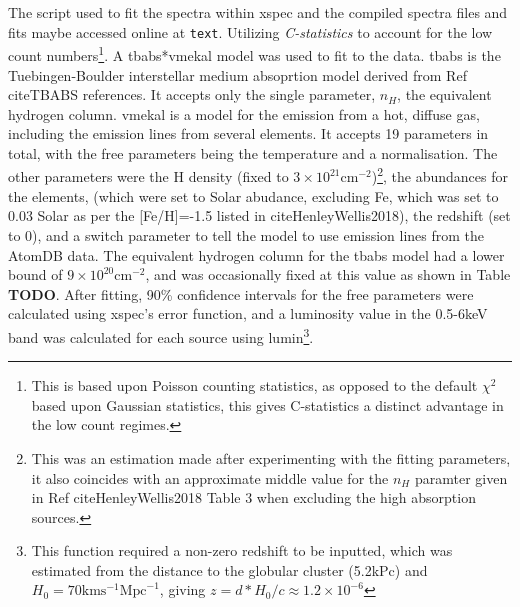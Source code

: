 \documentclass[aps,
                pra,  
                a4paper, 
                amsmath, 
                amssymb, 
                preprint,
                tightenlines,  
                amsfonts,
                nofootinbib,
                notitlepage
            ]{revtex4-2}
\begin{document}
The script used to fit the spectra within {\sc xspec} and the compiled spectra files and fits maybe accessed online at {\verb|text|}. Utilizing {\it C-statistics} to account for the low count numbers\footnote{This is based upon Poisson counting statistics, as opposed to the default $\chi^2$ based upon Gaussian statistics, this gives C-statistics a distinct advantage in the low count regimes.}. A {\sc tbabs*vmekal} model was used to fit to the data. {\sc tbabs} is the Tuebingen-Boulder interstellar medium absoprtion model derived from Ref cite{TBABS references}. It accepts only the single parameter, $n_H$, the equivalent hydrogen column. {\sc vmekal} is a model for the emission from a hot, diffuse gas, including the emission lines from several elements. It accepts 19 parameters in total, with the free parameters being the temperature and a normalisation. The other parameters were the H density (fixed to $3\times10^{21}\text{cm}^{-2}$)\footnote{This was an estimation made after experimenting with the fitting parameters, it also coincides with an approximate middle value for the $n_H$ paramter given in Ref cite{HenleyWellis2018} Table 3 when excluding the high absorption sources.}, the abundances for the elements, (which were set to Solar abudance, excluding Fe, which was set to 0.03 Solar as per the [Fe/H]=-1.5 listed in cite{HenleyWellis2018}), the redshift (set to 0), and a switch parameter to tell the model to use emission lines from the AtomDB data. The equivalent hydrogen column for the {\sc tbabs} model had a lower bound of $9\times10^{20}\text{cm}^{-2}$, and was occasionally fixed at this value as shown in Table {\bf TODO}. After fitting, 90\% confidence intervals for the free parameters were calculated using {\sc xspec}'s {\sc error} function, and a luminosity value in the 0.5-6keV band was calculated for each source using {\sc lumin}\footnote{This function required a non-zero redshift to be inputted, which was estimated from the distance to the globular cluster (5.2kPc) and $H_0=70\text{km}\text{s}^{-1}\text{Mpc}^{-1}$, giving $z=d*H_0/c\approx1.2\times10^{-6}$}.
\end{document}
